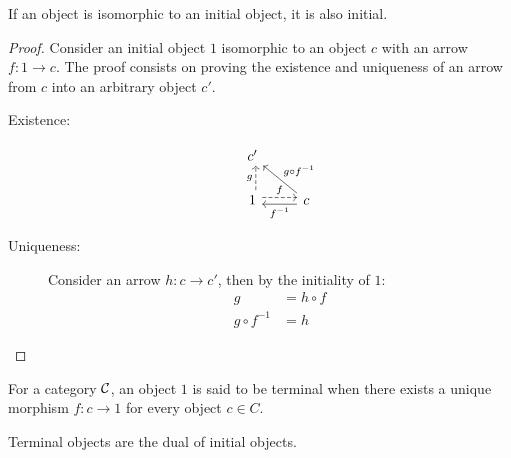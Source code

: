 \begin{theorem}
  If an object is isomorphic to an initial object, it is also initial.

  \begin{proof}
    Consider an initial object $1$ isomorphic to an object $c$ with an arrow
    $f:1\to c$. The proof consists on proving the existence and uniqueness of an
    arrow from $c$ into an arbitrary object $c'$.

    \begin{description}
      \item[Existence:]
        \[\begin{tikzcd}[ampersand replacement=\&]
          {c'} \\
          1 \& c
          \arrow["f", shift left=1, dashed, from=2-1, to=2-2]
          \arrow["{f^{-1}}", shift left=1, from=2-2, to=2-1]
          \arrow["g", shift right=1, dashed, from=2-1, to=1-1]
          \arrow["{g\circ f^{-1}}"', from=2-2, to=1-1]
        \end{tikzcd}\]
      \item[Uniqueness:] Consider an arrow $h:c\to c'$, then by the initiality
        of $1$:
        \[
          \begin{aligned}
            g &= h\circ f\\
            g\circ f^{-1} &= h
          \end{aligned}
        \]
    \end{description}
  \end{proof}
\end{theorem}

\begin{definition}
  For a category $\mathcal{C}$, an object $1$ is said to be terminal when there exists a
  unique morphism $f: c\to 1$ for every object $c\in C$.
  \parencite{awodey:category_theory}
\end{definition}

\begin{remark}
  Terminal objects are the dual of initial objects.
\end{remark}

